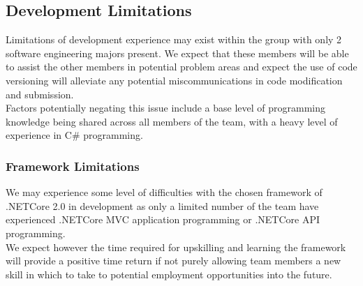 \documentclass{article}
\newcounter{num}
\begin{document}
        \subsection{Development Limitations}
            Limitations of development experience may exist within the group with only 2 software engineering majors
            present. We expect that these members will be able to assist the other members in potential problem 
            areas and expect the use of code versioning will alleviate any potential miscommunications in code 
            modification and submission.
            \\
            Factors potentially negating this issue include a base level of programming knowledge being shared across
            all members of the team, with a heavy level of experience in C\# programming.

            \subsubsection{Framework Limitations}
                We may experience some level of difficulties with the chosen framework of .NETCore 2.0 in development
                as only a limited number of the team have experienced .NETCore MVC application programming or 
                .NETCore API programming. 
                \\
                We expect however the time required for upskilling and learning the framework will provide a positive
                time return if not purely allowing team members a new skill in which to take to potential employment 
                opportunities into the future.
        
        \newpage
\end{document}
